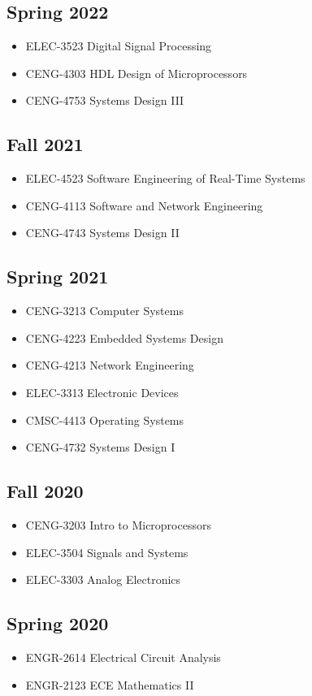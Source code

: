 \documentclass{article}
\begin{document}
		\subsection{Spring 2022}
			\begin{itemize}
				\item ELEC-3523 Digital Signal Processing
				\item CENG-4303 HDL Design of Microprocessors
				\item CENG-4753 Systems Design III
			\end{itemize}
		\subsection{Fall 2021}
			\begin{itemize}
				\item ELEC-4523 Software Engineering of Real-Time Systems
				\item CENG-4113 Software and Network Engineering
				\item CENG-4743 Systems Design II
			\end{itemize}
		\subsection{Spring 2021}
			\begin{itemize}
				\item CENG-3213 Computer Systems
				\item CENG-4223 Embedded Systems Design
				\item CENG-4213 Network Engineering
				\item ELEC-3313 Electronic Devices
				\item CMSC-4413 Operating Systems
				\item CENG-4732 Systems Design I
			\end{itemize}
		\subsection{Fall 2020}
			\begin{itemize}
				\item CENG-3203 Intro to Microprocessors
				\item ELEC-3504 Signals and Systems
				\item ELEC-3303 Analog Electronics
			\end{itemize}
		\subsection{Spring 2020}
			\begin{itemize}
				\item ENGR-2614 Electrical Circuit Analysis
				\item ENGR-2123 ECE Mathematics II
			\end{itemize}
\end{document}
